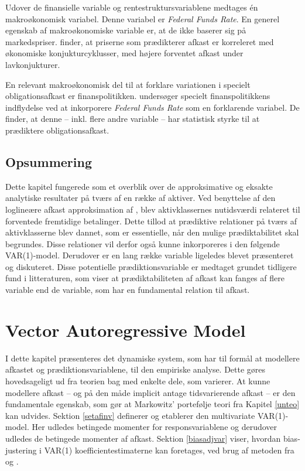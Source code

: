 \documentclass[
  a4paper,
  oneside]{memoir}
\begin{document}
Udover de finansielle variable og rentestruktursvariablene medtages én makroøkonomisk variabel. Denne variabel er \emph{Federal Funds Rate}. En generel egenskab af makroøkonomiske variable er, at de ikke baserer sig på markedspriser. \citep{Cochrane2008} finder, at priserne som prædikterer afkast er korreleret med økonomiske konjukturcyklusser, med højere forventet afkast under lavkonjukturer.

En relevant makroøkonomisk del til at forklare variationen i specielt obligationsafkast er finanspolitikken. \citep{Dai2005} undersøger specielt finanspolitikkens indflydelse ved at inkorporere \emph{Federal Funds Rate} som en forklarende variabel. De finder, at denne -- inkl. flere andre variable -- har statistisk styrke til at prædiktere obligationsafkast.

\hypertarget{opsafkrel}{%
\section{Opsummering}\label{opsafkrel}}

Dette kapitel fungerede som et overblik over de approksimative og eksakte analytiske resultater på tværs af en række af aktiver. Ved benyttelse af den loglineære afkast approksimation af \citep{Campbell1988}, blev aktivklassernes nutidsværdi relateret til forventede fremtidige betalinger. Dette tillod at prædiktive relationer på tværs af aktivklasserne blev dannet, som er essentielle, når den mulige prædiktabilitet skal begrundes. Disse relationer vil derfor også kunne inkorporeres i den følgende VAR(1)-model. Derudover er en lang række variable ligeledes blevet præsenteret og diskuteret. Disse potentielle prædiktionsvariable er medtaget grundet tidligere fund i litteraturen, som viser at prædiktabiliteten af afkast kan fanges af flere variable end de variable, som har en fundamental relation til afkast.

\hypertarget{varkapitel}{%
\chapter{Vector Autoregressive Model}\label{varkapitel}}

I dette kapitel præsenteres det dynamiske system, som har til formål at modellere afkastet og prædiktionsvariablene, til den empiriske analyse. Dette gøres hovedsageligt ud fra teorien bag \citep{Userguide2004} med enkelte dele, som varierer. At kunne modellere afkast -- og på den måde implicit antage tidsvarierende afkast -- er den fundamentale egenskab, som gør at Markowitz' portefølje teori fra Kapitel \ref{unteo} kan udvides. Sektion \ref{setafinv} definerer og etablerer den multivariate VAR(1)-model. Her udledes betingede momenter for responsvariablene og derudover udledes de betingede momenter af afkast. Sektion \ref{biasadjvar} viser, hvordan bias-justering i VAR(1) koefficientestimaterne kan foretages, ved brug af metoden fra \citep{Engsted2012} og \citep{Pope1990}.
\end{document}
